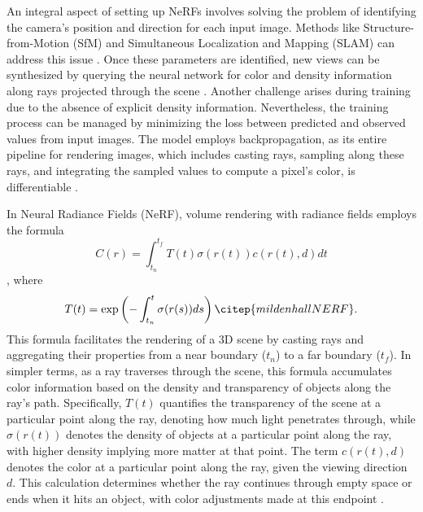 An integral aspect of setting up NeRFs involves solving the problem of identifying the camera's position and direction for each input image. Methods like Structure-from-Motion (SfM) and Simultaneous Localization and Mapping (SLAM) can address this issue \citep{wei2021nerfingmvs}. Once these parameters are identified, new views can be synthesized by querying the neural network for color and density information along rays projected through the scene \citep{gerats2023dynamic}. Another challenge arises during training due to the absence of explicit density information. Nevertheless, the training process can be managed by minimizing the loss between predicted and observed values from input images. The model employs backpropagation, as its entire pipeline for rendering images, which includes casting rays, sampling along these rays, and integrating the sampled values to compute a pixel's color, is differentiable \citep{yariv2020multiview}.

In Neural Radiance Fields (NeRF), volume rendering with radiance fields employs the formula 
\[ C(r) = \int_{t_n}^{t_f} T(t)\sigma(r(t))c(r(t), d)dt \],
where 
\[ T(t) = \exp\left(-\int_{t_n}^t \sigma(r(s))ds\right) \citep{mildenhallNERF}. \]
This formula facilitates the rendering of a 3D scene by casting rays and aggregating their properties from a near boundary (\(t_n\)) to a far boundary (\(t_f\)). In simpler terms, as a ray traverses through the scene, this formula accumulates color information based on the density and transparency of objects along the ray's path. Specifically, \( T(t) \) quantifies the transparency of the scene at a particular point along the ray, denoting how much light penetrates through, while \( \sigma(r(t)) \) denotes the density of objects at a particular point along the ray, with higher density implying more matter at that point. The term \( c(r(t), d) \) denotes the color at a particular point along the ray, given the viewing direction \( d \). This calculation determines whether the ray continues through empty space or ends when it hits an object, with color adjustments made at this endpoint \citep{mildenhallNERF}.

